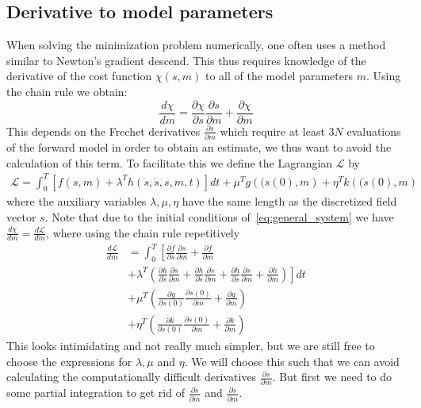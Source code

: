 \documentclass[fleqn,11pt]{SelfArx} %
\newcommand{\pder}[2][]{\frac{\partial#1}{\partial#2}}
\theoremstyle{definition}
\begin{document}
\subsection{Derivative to model parameters}
 When solving the minimization problem numerically, one often uses a method similar to Newton's gradient descend. This thus requires knowledge of the derivative of the cost function $\chi\left(s,m\right)$ to all of the model parameters $m$. Using the chain rule we obtain:
\begin{equation}\label{eq:derivative_of_chi}
\frac{d\chi}{dm} = \frac{\partial \chi}{\partial s}\frac{\partial s}{\partial m} + \frac{\partial \chi}{\partial m}
\end{equation}
This depends on the Frechet derivatives $\frac{\partial s}{\partial m}$ which require at least $3N$ evaluations of the forward model in order to obtain an estimate, we thus want to avoid the calculation of this term. To facilitate this we define the Lagrangian $\mathcal{L}$ by
\begin{equation}\label{eq:lagrangian}
\begin{aligned}
\mathcal{L} =   \int_0^T \left[f\left(s, m \right) + \lambda^T h\left(\ddot s, \dot s, s, m , t\right)\right] dt 
+ \mu ^T g\left((s\left(0\right), m\right)  + \eta^T k\left((\dot{s}\left(0\right), m\right)
\end{aligned}
\end{equation}
where the auxiliary variables $\lambda, \mu, \eta$ have the same length as the discretized field vector $s$.
Note that due to the initial conditions of~\cref{eq:general_system} we have $\frac{d\chi}{dm} = \frac{d\mathcal{L}}{dm}$, where using the chain rule repetitively 
\begin{equation}\label{eq:lagrangian_derivative_general}
\begin{aligned}
\frac{d\mathcal{L}}{dm} & =  \int_0^T \left[ \pder[f]{s} \pder[s]{m} + \pder[f]{m} \right. \\
& \left. + \lambda^T \left(\pder[h]{\ddot s}\pder[\ddot s]{m} + \pder[h]{\dot s} \pder[\dot s]{m} + \pder[h]{s}\pder[s]{m} + \pder[h]{m}\right) \right]dt  \\
& + \mu^T \left(\pder[g]{s(0)} \pder[s(0)]{m} + \pder[g]{m} \right) \\
& + \eta^T \left(\pder[k]{\dot s(0)} \pder[\dot s(0)]{m} + \pder[k]{m} \right)    
\end{aligned}
\end{equation}
This looks intimidating and not really much simpler, but we are still free to choose the expressions for $\lambda, \mu$ and $\eta$. We will choose this such that we can avoid calculating the computationally difficult derivatives $\pder[s]{m}$. But first we need to do some partial integration to get rid of  $\pder[\dot s]{m}$ and $\pder[\ddot s]{m}$.
\end{document}
